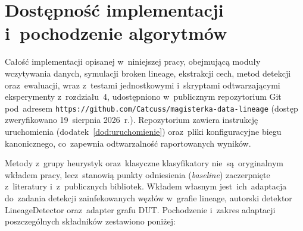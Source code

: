 \section{Dostępność implementacji i~pochodzenie algorytmów}
\label{sec:repozytorium}

Całość implementacji opisanej w~niniejszej pracy, obejmującą moduły
wczytywania danych, symulacji broken lineage, ekstrakcji cech, metod
detekcji oraz~ewaluacji, wraz z~testami jednostkowymi i~skryptami
odtwarzającymi eksperymenty z~rozdziału~4, udostępniono w~publicznym
repozytorium Git
pod~adresem \texttt{https://github.com/Catcuss/magisterka-data-lineage}
(dostęp zweryfikowano 19~sierpnia 2026~r.). Repozytorium zawiera instrukcję
uruchomienia (dodatek~\ref{dod:uruchomienie}) oraz~pliki konfiguracyjne biegu
kanonicznego, co~zapewnia odtwarzalność raportowanych wyników.

Metody z~grupy heurystyk oraz~klasyczne klasyfikatory nie~są~oryginalnym
wkładem pracy, lecz~stanowią punkty odniesienia (\emph{baseline}) zaczerpnięte
z~literatury i~z~publicznych bibliotek. Wkładem własnym jest~ich~adaptacja
do~zadania detekcji zainfekowanych węzłów w~grafie lineage, autorski detektor
LineageDetector oraz~adapter grafu DUT. Pochodzenie i~zakres adaptacji
poszczególnych składników zestawiono poniżej:

